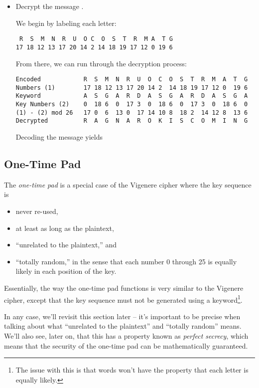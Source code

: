 \documentclass[letterpaper]{article}
\begin{document}
\begin{mdframed}
\begin{itemize}
        \item Decrypt the message .
        \begin{mdframed}
            We begin by labeling each letter: 
            \begin{mdframed}
                \begin{verbatim}
 R  S  M  N  R  U  O C  O  S  T  R  M A  T G
17 18 12 13 17 20 14 2 14 18 19 17 12 0 19 6\end{verbatim}
            \end{mdframed}
            From there, we can run through the decryption process: 
            \begin{mdframed}
\begin{verbatim}
Encoded            R  S  M  N  R  U  O  C  O  S  T  R  M  A  T  G
Numbers (1)        17 18 12 13 17 20 14 2  14 18 19 17 12 0  19 6
Keyword            A  S  G  A  R  D  A  S  G  A  R  D  A  S  G  A 
Key Numbers (2)    0  18 6  0  17 3  0  18 6  0  17 3  0  18 6  0 
(1) - (2) mod 26   17 0  6  13 0  17 14 10 8  18 2  14 12 8  13 6
Decrypted          R  A  G  N  A  R  O  K  I  S  C  O  M  I  N  G\end{verbatim}
            \end{mdframed}
            Decoding the message yields
            \begin{mdframed}
            \end{mdframed}
        \end{mdframed}
    \end{itemize}
\end{mdframed}

\subsection{One-Time Pad}
The \emph{one-time pad} is a special case of the Vigenere cipher where the key sequence is 
\begin{itemize}
    \item never re-used, 
    \item at least as long as the plaintext, 
    \item ``unrelated to the plaintext,'' and 
    \item ``totally random,'' in the sense that each number 0 through 25 is equally likely in each position of the key.
\end{itemize}
Essentially, the way the one-time pad functions is very similar to the Vigenere cipher, except that the key sequence must not be generated using a keyword\footnote{The issue with this is that words won't have the property that each letter is equally likely.}. 

\bigskip 

In any case, we'll revisit this section later -- it's important to be precise when talking about what ``unrelated to the plaintext'' and ``totally random'' means. We'll also see, later on, that this has a property known as \emph{perfect secrecy}, which means that the security of the one-time pad can be mathematically guaranteed. 
\end{document}
